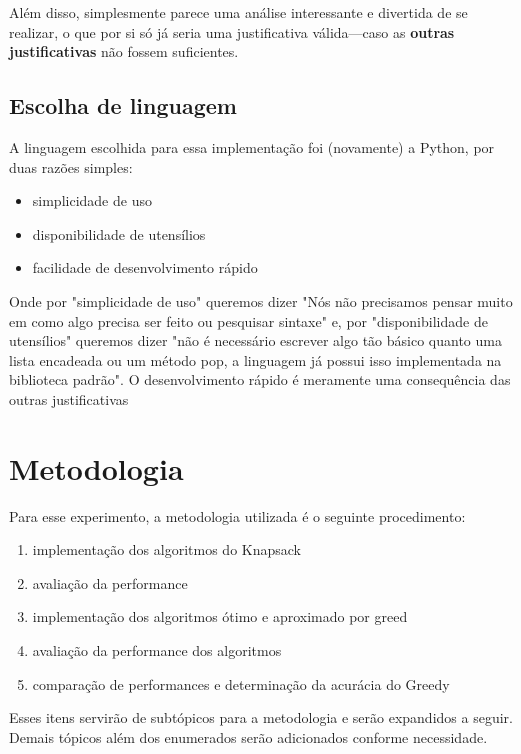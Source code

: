\documentclass{article}
\begin{document}
    Além disso, simplesmente parece uma análise interessante e divertida de se realizar, o que por si só já seria uma justificativa válida—caso as \textbf{outras justificativas} não fossem suficientes.


\subsection{Escolha de linguagem}
    A linguagem escolhida para essa implementação foi (novamente) a Python, por duas razões simples:
    \begin{itemize}
        \item simplicidade de uso
        \item disponibilidade de utensílios
        \item facilidade de desenvolvimento rápido
    \end{itemize}
    Onde por "simplicidade de uso" queremos dizer "Nós não precisamos pensar muito em como algo precisa ser feito ou pesquisar sintaxe" e, por "disponibilidade de utensílios" queremos dizer "não é necessário escrever algo tão básico quanto uma lista encadeada ou um método pop, a linguagem já possui isso implementada na biblioteca padrão". O desenvolvimento rápido é meramente uma consequência das outras justificativas\\

\section{Metodologia}
    Para esse experimento, a metodologia utilizada é o seguinte procedimento:
    \begin{enumerate}
        \item implementação dos algoritmos do Knapsack
        \item avaliação da performance
        \item implementação dos algoritmos ótimo e aproximado por greed
        \item avaliação da performance dos algoritmos
        \item comparação de performances e determinação da acurácia do Greedy
    \end{enumerate}
    Esses itens servirão de subtópicos para a metodologia e serão expandidos a seguir.\\
    Demais tópicos além dos enumerados serão adicionados conforme necessidade.\\
\end{document}
